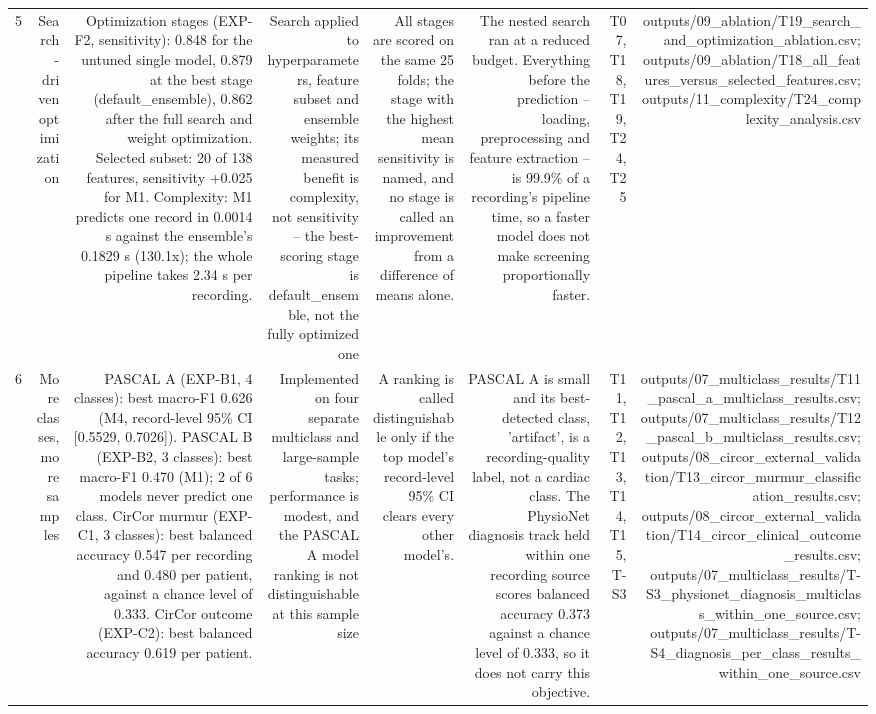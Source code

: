 \begin{table}[htbp]
\begin{tabular}{lrrrrrrr}
    5 & Search-driven optimization & Optimization stages (EXP-F2, sensitivity): 0.848 for the untuned single model, 0.879 at the best stage (default\_ensemble), 0.862 after the full search and weight optimization. Selected subset: 20 of 138 features, sensitivity +0.025 for M1. Complexity: M1 predicts one record in 0.0014 s against the ensemble's 0.1829 s (130.1x); the whole pipeline takes 2.34 s per recording. & Search applied to hyperparameters, feature subset and ensemble weights; its measured benefit is complexity, not sensitivity -- the best-scoring stage is default\_ensemble, not the fully optimized one & All stages are scored on the same 25 folds; the stage with the highest mean sensitivity is named, and no stage is called an improvement from a difference of means alone. & The nested search ran at a reduced budget. Everything before the prediction -- loading, preprocessing and feature extraction -- is 99.9\% of a recording's pipeline time, so a faster model does not make screening proportionally faster. & T07, T18, T19, T24, T25 & outputs/09\_ablation/T19\_search\_and\_optimization\_ablation.csv; outputs/09\_ablation/T18\_all\_features\_versus\_selected\_features.csv; outputs/11\_complexity/T24\_complexity\_analysis.csv \\
    6 & More classes, more samples & PASCAL A (EXP-B1, 4 classes): best macro-F1 0.626 (M4, record-level 95\% CI [0.5529, 0.7026]). PASCAL B (EXP-B2, 3 classes): best macro-F1 0.470 (M1); 2 of 6 models never predict one class. CirCor murmur (EXP-C1, 3 classes): best balanced accuracy 0.547 per recording and 0.480 per patient, against a chance level of 0.333. CirCor outcome (EXP-C2): best balanced accuracy 0.619 per patient. & Implemented on four separate multiclass and large-sample tasks; performance is modest, and the PASCAL A model ranking is not distinguishable at this sample size & A ranking is called distinguishable only if the top model's record-level 95\% CI clears every other model's. & PASCAL A is small and its best-detected class, 'artifact', is a recording-quality label, not a cardiac class. The PhysioNet diagnosis track held within one recording source scores balanced accuracy 0.373 against a chance level of 0.333, so it does not carry this objective. & T11, T12, T13, T14, T15, T-S3 & outputs/07\_multiclass\_results/T11\_pascal\_a\_multiclass\_results.csv; outputs/07\_multiclass\_results/T12\_pascal\_b\_multiclass\_results.csv; outputs/08\_circor\_external\_validation/T13\_circor\_murmur\_classification\_results.csv; outputs/08\_circor\_external\_validation/T14\_circor\_clinical\_outcome\_results.csv; outputs/07\_multiclass\_results/T-S3\_physionet\_diagnosis\_multiclass\_within\_one\_source.csv; outputs/07\_multiclass\_results/T-S4\_diagnosis\_per\_class\_results\_within\_one\_source.csv \\

\end{tabular}
\end{table}

